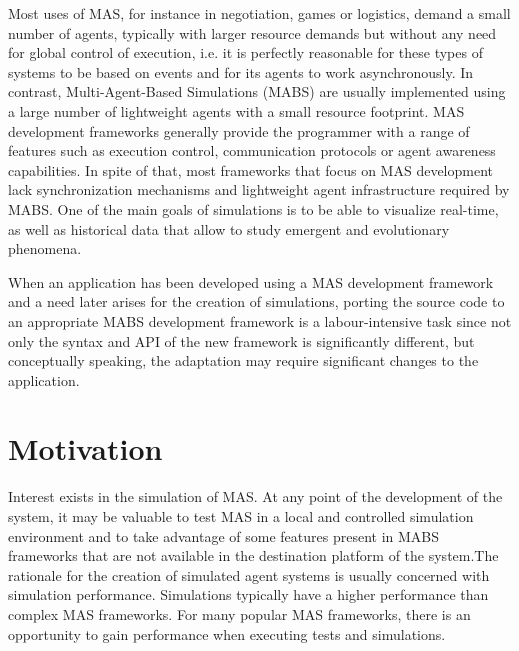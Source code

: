 Most uses of MAS, for instance in negotiation, games or logistics, demand a small number of agents, typically with larger resource demands but without any need for global control of execution, i.e. it is perfectly reasonable for these types of systems to be based on events and for its agents to work asynchronously. In contrast, Multi-Agent-Based Simulations (MABS) are usually implemented using a large number of lightweight agents with a small resource footprint. MAS development frameworks generally provide the programmer with a range of features such as execution control, communication protocols or agent awareness capabilities. In spite of that, most frameworks that focus on MAS development lack synchronization mechanisms and lightweight agent infrastructure required by MABS. One of the main goals of simulations is to be able to visualize real-time, as well as historical data that allow to study emergent and evolutionary phenomena. \cite{mengistu2008scalability}

When an application has been developed using a MAS development framework and a need later arises for the creation of simulations, porting the source code to an appropriate MABS development framework is a labour-intensive task since not only the syntax and API of the new framework is significantly different, but conceptually speaking, the adaptation may require significant changes to the application.


\section{Motivation}
Interest exists in the simulation of MAS. At any point of the development of the system, it may be valuable to test MAS in a local and controlled simulation environment and to take advantage of some features present in MABS frameworks that are not available in the destination platform of the system.The rationale for the creation of simulated agent systems is usually concerned with simulation performance. Simulations typically have a higher performance than complex MAS frameworks. For many popular MAS frameworks, there is an opportunity to gain performance when executing tests and simulations. 

